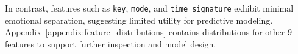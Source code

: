 \documentclass{article}
\begin{document}
In contrast, features such as \texttt{key}, \texttt{mode}, and \texttt{time signature} exhibit minimal emotional separation, suggesting limited utility for predictive modeling. Appendix~\ref{appendix:feature_distributions} contains distributions for other 9 features to support further inspection and model design.







\end{document}

